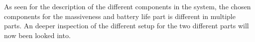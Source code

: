 %
%
%
%
%
%
%
As seen for the description of the different components in the system, the chosen components for the massiveness and battery life part is different in multiple parts. An deeper inspection of the different setup for the two different parts will now been looked into.


